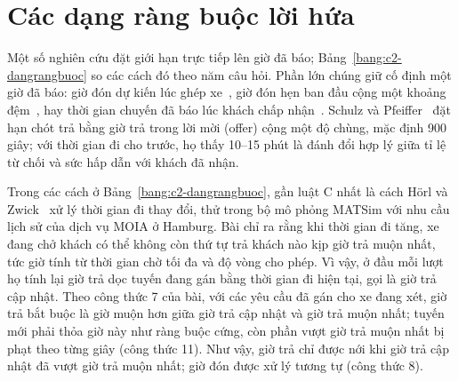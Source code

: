 \section{Các dạng ràng buộc lời hứa}
\label{muc:c2-rangbuoc}

Một số nghiên cứu đặt giới hạn trực tiếp lên giờ đã báo; Bảng~\ref{bang:c2-dangrangbuoc} so các cách đó theo năm câu
hỏi. Phần lớn chúng giữ cố định một giờ đã báo: giờ đón
dự kiến lúc ghép xe~\cite{alonsomora2017}, giờ đón hẹn ban đầu cộng một khoảng đệm~\cite{lu2024}, hay thời gian
chuyến đã báo lúc khách chấp nhận~\cite{laupichler2026}. Schulz và Pfeiffer~\cite{schulz2026} đặt hạn chót trả bằng
giờ trả trong lời mời (offer) cộng một độ chùng, mặc định 900 giây; với thời gian đi cho trước, họ thấy 10--15 phút là
đánh đổi hợp lý giữa tỉ lệ từ chối và sức hấp dẫn với khách đã nhận.

Trong các cách ở Bảng~\ref{bang:c2-dangrangbuoc}, gần luật C nhất là cách Hörl và Zwick~\cite{horl2022} xử lý thời
gian đi thay đổi, thử trong bộ mô phỏng MATSim với nhu cầu lịch sử của dịch vụ MOIA ở Hamburg. Bài chỉ ra rằng khi
thời gian đi tăng, xe đang chở khách có thể không còn thứ tự trả khách nào kịp giờ trả muộn nhất, tức giờ tính từ thời
gian chờ tối đa và độ vòng cho phép. Vì vậy, ở đầu mỗi lượt họ tính lại giờ trả dọc tuyến đang gán bằng thời gian đi hiện
tại, gọi là giờ trả cập nhật. Theo công thức 7 của bài, với các yêu cầu đã gán cho xe đang xét, giờ trả bắt buộc là
giờ muộn hơn giữa giờ trả cập nhật và giờ trả muộn nhất; tuyến mới phải thỏa giờ này như ràng buộc cứng, còn phần vượt
giờ trả muộn nhất bị phạt theo từng giây (công thức 11). Như vậy, giờ trả chỉ được nới khi giờ trả cập nhật đã vượt
giờ trả muộn nhất; giờ đón được xử lý tương tự (công thức 8).

